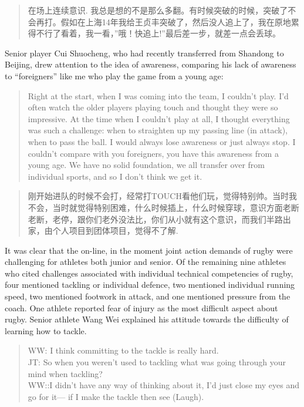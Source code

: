 \begin{CJK}{UTF8}{gbsn}
  \begin{quotation}
    在场上连续意识. 我总是想的不是那么多翻。有时候突破的时候，突破了不会再打。假如在上海14年我给王贞丰突破了，然后没人追上了，我在原地累得不行了看着，我一看，''哦！快追上!''最后差一步，就差一点会丢球。
  \end{quotation}

Senior player Cui Shuocheng, who had recently transferred from Shandong to Beijing, drew attention to the idea of awareness, comparing his lack of awareness to ``foreigners'' like me who play the game from a young age:

    \begin{quotation}
      Right at the start, when I was coming into the team, I couldn't play. I'd often watch the older players playing touch and thought they were so impressive.  At the time when I couldn't play at all, I thought everything was such a challenge: when to straighten up my passing line (in attack), when to pass the ball.  I would always lose awareness or just always stop. I couldn't compare with you foreigners, you have this awareness from a young age.  We have no solid foundation, we all transfer over from individual sports, and so I don't think we get it.
    \end{quotation}

    \begin{quotation}
      刚开始进队的时候不会打，经常打TOUCH看他们玩，觉得特别帅。当时我不会，当时就觉得特别困难，什么时候插上，什么时候穿球，意识方面老断老断，老停，跟你们老外没法比，你们从小就有这个意识，而我们半路出家，由个人项目到团体项目，觉得不了解.
    \end{quotation}

It was clear that the on-line, in the moment joint action demands of rugby were challenging for athletes both junior and senior.  Of the remaining nine athletes who cited challenges associated with individual technical competencies of rugby, four mentioned tackling or individual defence, two mentioned individual running speed, two mentioned footwork in attack, and one mentioned pressure from the coach. One athlete reported fear of injury as the most difficult aspect about rugby.   Senior athlete Wang Wei explained his attitude towards the difficulty of learning how to tackle.

\begin{quotation}
  WW: I think committing to the tackle is really hard. \\
  JT: So when you weren’t used to tackling what was going through your mind when tackling? \\
  WW::I didn’t have any way of thinking about it, I’d just close my eyes and go for it--- if I make the tackle then see (Laugh).
\end{quotation}


\end{CJK}
